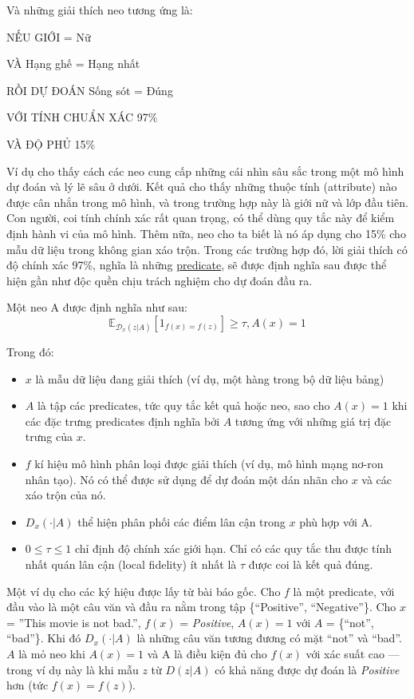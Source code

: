 Và những giải thích neo tương ứng là:

NẾU GIỚI = Nữ

VÀ Hạng ghế = Hạng nhất

RỒI DỰ ĐOÁN Sống sót = Đúng

VỚI TÍNH CHUẨN XÁC 97\%

VÀ ĐỘ PHỦ 15\%

Ví dụ cho thấy cách các neo cung cấp những cái nhìn sâu sắc trong một mô hình dự đoán và lý lẽ sâu ở dưới. Kết quả cho thấy những thuộc tính (attribute) nào được cân nhắn trong mô hình, và trong trường hợp này là giới nữ và lớp đầu tiên. Con người, coi tính chính xác rất quan trọng, có thể dùng quy tắc này để kiểm định hành vi của mô hình. Thêm nữa, neo cho ta biết là nó áp dụng cho 15\% cho mẫu dữ liệu trong không gian xáo trộn. Trong các trường hợp đó, lời giải thích có độ chính xác 97\%, nghĩa là những \href{https://en.wikipedia.org/wiki/Predicate_(mathematical_logic)}{predicate}, sẽ được định nghĩa sau được thể hiện gần như độc quền chịu trách nghiệm cho dự đoán đầu ra.

Một neo A được định nghĩa như sau:
$$\mathbb{E}_{\mathcal{D}_x(z|A)}[1_{f(x)=f(z)}]\geq\tau,A(x)=1$$

Trong đó:
\begin{itemize}

\item $x$ là mẫu dữ liệu đang giải thích (ví dụ, một hàng trong bộ dữ liệu bảng)
\item $A$ là tập các predicates, tức quy tắc kết quả hoặc neo, sao cho $A(x) = 1$ khi các đặc trưng predicates định nghĩa bởi $A$ tương ứng với những giá trị đặc trưng của $x$. 
\item $f$ kí hiệu mô hình phân loại được giải thích (ví dụ, mô hình mạng nơ-ron nhân tạo). Nó có thể được sử dụng để dự đoán một dán nhãn cho $x$ và các xáo trộn của nó.
\item $D_x(\cdot | A)$ thể hiện phân phối các điểm lân cận trong $x$ phù hợp với A.
\item $0 \leq \tau \leq 1$ chỉ định độ chính xác giới hạn. Chỉ có các quy tắc thu được tính nhất quán lân cận (local fidelity) ít nhất là $\tau$ được coi là kết quả đúng.

\end{itemize}
Một ví dụ cho các ký hiệu được lấy từ bài báo gốc. Cho $f$ là một predicate, với đầu vào là một câu văn và đầu ra nằm trong tập \{“Positive”, “Negative”\}. Cho $x$ = ”This movie is not bad.”, $f(x)$ = \textit{Positive}, $A(x) =1$ với $A$ = \{“not”, “bad”\}. Khi đó $D_x(\cdot | A)$ là những câu văn tương đương có mặt “not” và “bad”. $A$ là mỏ neo khi $A(x) = 1$ và A là điều kiện đủ cho $f(x)$ với xác suất cao — trong ví dụ này là khi mẫu $z$ từ $D(z | A)$ có khả năng được dự đoán là \textit{Positive} hơn (tức $f(x) = f(z)$).

